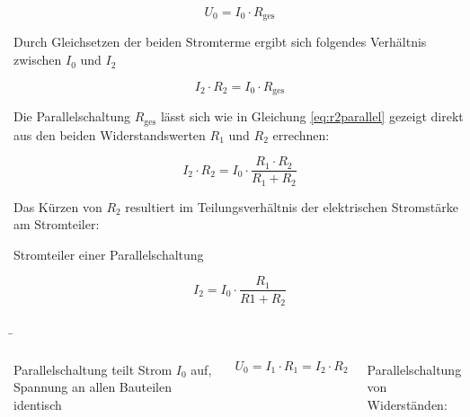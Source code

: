 \begin{frame}
{	\begin{equation*}
		U_0 = I_0 \cdot R_\mathrm{ges}
	\end{equation*}

	Durch Gleichsetzen der beiden Stromterme ergibt sich folgendes Verhältnis zwischen $I_0$ und $I_2$

	\begin{equation*}
		I_2 \cdot R_2 = I_0 \cdot R_\mathrm{ges}
	\end{equation*}

	Die Parallelschaltung $R_\mathrm{ges}$ lässt sich wie in Gleichung \ref{eq:r2parallel} gezeigt direkt aus den beiden Widerstandswerten
	$R_1$ und $R_2$ errechnen:

	\begin{equation*}
		I_2 \cdot R_2 = I_0 \cdot \frac{R_1 \cdot R_2}{R_1 + R_2}
	\end{equation*}

	Das Kürzen von $R_2$ resultiert im Teilungsverhältnis der elektrischen Stromstärke am Stromteiler:

	\begin{Merksatz}{Stromteiler einer Parallelschaltung}

		\begin{equation}
			I_2 = I_0 \cdot \frac{R_1}{R1 + R_2}
		\end{equation}
	\end{Merksatz}

	














	}
	

	\b{
		\begin{columns}

			Parallelschaltung teilt Strom $I_0$ auf,
			Spannung an allen Bauteilen identisch

			\begin{equation*}
				U_0 = I_1 \cdot R_1 = I_2 \cdot R_2
			\end{equation*}

			Parallelschaltung von Widerständen: 


\end{columns}}
\end{frame}
